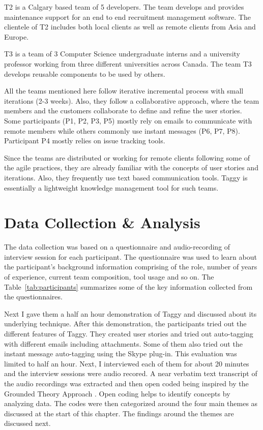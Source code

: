 T2 is a Calgary based team of 5 developers. The team develops and provides maintenance support for an end to end recruitment management software. The clientele of T2 includes both local clients as well as remote clients from Asia and Europe. 

T3 is a team of 3 Computer Science undergraduate interns and a university professor working from three different universities across Canada. The team T3 develops reusable components to be used by others.

All the teams mentioned here follow iterative incremental process with small iterations (2-3 weeks). Also, they follow a collaborative approach, where the team members and the customers collaborate to define and refine the user stories. Some participants (P1, P2, P3, P5) mostly rely on emails to communicate with remote members while others commonly use instant messages (P6, P7, P8). Participant P4 mostly relies on issue tracking tools.

Since the teams are distributed or working for remote clients following some of the agile practices, they are already familiar with the concepts of user stories and iterations. Also, they frequently use text based communication tools. Taggy is essentially a lightweight knowledge management tool for such teams.

\section{Data Collection \& Analysis}
The data collection was based on a questionnaire and audio-recording of interview session for each participant. The questionnaire was used to learn about the participant's background information comprising of the role, number of years of experience, current team composition, tool usage and so on. The Table~\ref{tab:participants} summarizes some of the key information collected from the questionnaires.

Next I gave them a half an hour demonstration of Taggy and discussed about its underlying technique. After this demonstration, the participants tried out the different features of Taggy. They created user stories and tried out auto-tagging with different emails including attachments. Some of them also tried out the instant message auto-tagging using the Skype plug-in. This evaluation was limited to half an hour. Next, I interviewed each of them for about 20 minutes and the interview sessions were audio recored. A near verbatim text transcript of the audio recordings was extracted and then open coded being inspired by the Grounded Theory Approach \cite{grounded_theory}. Open coding helps to identify concepts by analyzing data. The codes were then categorized around the four main themes as discussed at the start of this chapter. The findings around the themes are discussed next.

